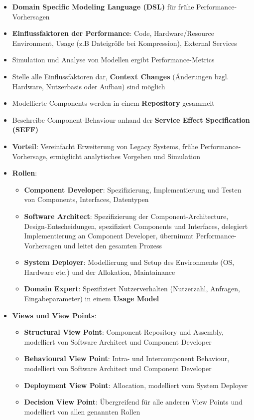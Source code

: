 \begin{itemize}
	\item \textbf{Domain Specific Modeling Language (DSL)} für frühe Performance-Vorhersagen
	\item \textbf{Einflussfaktoren der Performance}: Code, Hardware/Resource Environment, Usage (z.B Dateigröße bei Kompression), External Services
	\item Simulation und Analyse von Modellen ergibt Performance-Metrics
	\item Stelle alle Einflussfaktoren dar, \textbf{Context Changes} (Änderungen bzgl. Hardware, Nutzerbasis oder Aufbau) sind möglich
	\item Modellierte Components werden in einem \textbf{Repository} gesammelt
	\item Beschreibe Component-Behaviour anhand der \textbf{Service Effect Specification (SEFF)}
	\item \textbf{Vorteil}: Vereinfacht Erweiterung von Legacy Systems, frühe Performance-Vorhersage, ermöglicht analytisches Vorgehen und Simulation
	\item \textbf{Rollen}:
	\begin{itemize}
		\item \textbf{Component Developer}: Spezifizierung, Implementierung und Testen von Components, Interfaces, Datentypen
		\item \textbf{Software Architect}: Spezifizierung der Component-Architecture, Design-Entscheidungen, spezifiziert Components und Interfaces, delegiert Implementierung an Component Developer, übernimmt Performance-Vorhersagen und leitet den gesamten Prozess
		\item \textbf{System Deployer}: Modellierung und Setup des Environments (OS, Hardware etc.) und der Allokation, Maintainance
		\item \textbf{Domain Expert}: Spezifiziert Nutzerverhalten (Nutzerzahl, Anfragen, Eingabeparameter) in einem \textbf{Usage Model}
	\end{itemize}
	\item \textbf{Views und View Points}:
	\begin{itemize}
		\item \textbf{Structural View Point}: Component Repository und Assembly, modelliert von Software Architect und Component Developer
		\item \textbf{Behavioural View Point}: Intra- und Intercomponent Behaviour, modelliert von Software Architect und Component Developer
		\item \textbf{Deployment View Point}: Allocation, modelliert vom System Deployer
		\item \textbf{Decision View Point}: Übergreifend für alle anderen View Points und modelliert von allen genannten Rollen
	\end{itemize}
\end{itemize}